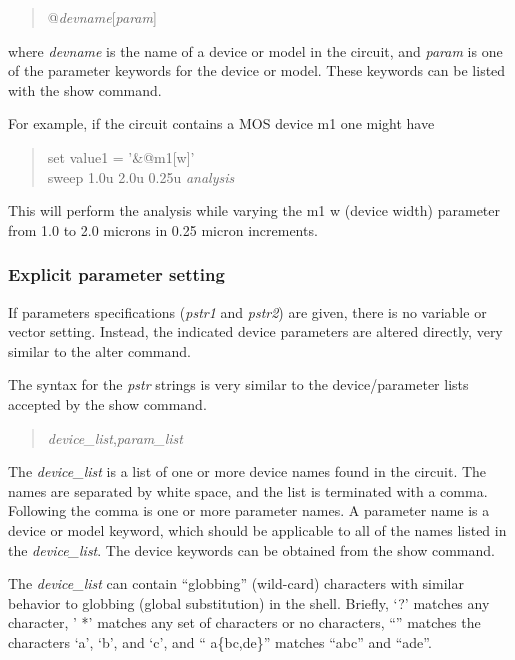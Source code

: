 \begin{enumerate}
{\begin{quote}
{\vt @}{\it devname\/}{\vt [}{\it param\/}{\vt ]}
\end{quote}

where {\it devname} is the name of a device or model in the circuit,
and {\it param} is one of the parameter keywords for the device or
model.  These keywords can be listed with the {\cb show} command.

For example, if the circuit contains a MOS device {\vt m1} one might
have

\begin{quote}
{\vt set value1 = '\&@m1[w]'}\\
{\vt sweep 1.0u 2.0u 0.25u} {\it analysis}
\end{quote}

This will perform the analysis while varying the {\vt m1} {\vt w}
(device width) parameter from 1.0 to 2.0 microns in 0.25 micron
increments.
}
\end{enumerate}

\subsubsection{Explicit parameter setting}

If parameters specifications ({\it pstr1} and {\it pstr2\/}) are
given, there is no variable or vector setting.  Instead, the indicated
device parameters are altered directly, very similar to the {\cb
alter} command.

The syntax for the {\it pstr} strings is very similar to the
device/parameter lists accepted by the {\cb show} command.

\begin{quote}
{\it device\_list\/}{\vt ,}{\it param\_list}
\end{quote}

The {\it device\_list} is a list of one or more device names found in
the circuit.  The names are separated by white space, and the list is
terminated with a comma.  Following the comma is one or more parameter
names.  A parameter name is a device or model keyword, which should be
applicable to all of the names listed in the {\it device\_list}.  The
device keywords can be obtained from the {\cb show} command.

The {\it device\_list} can contain ``globbing'' (wild-card)
characters with similar behavior to globbing (global substitution) in
the {\WRspice} shell.  Briefly, `{\vt ?}' matches any character, '{\vt
*}' matches any set of characters or no characters, ``{\vt [abc]}''
matches the characters `{\vt a}', `{\vt b}', and `{\vt c}', and ``{\vt
a}\{{\vt bc,de}\}'' matches ``{\vt abc}'' and ``{\vt ade}''.

